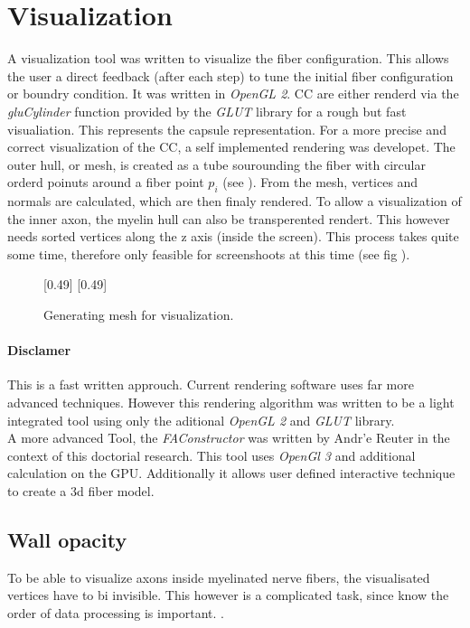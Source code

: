 \section{Visualization}
% 
A visualization tool was written to visualize the fiber configuration. This allows the user a direct feedback (\eg after each step) to tune the initial fiber configuration or boundry condition. It was written in \textit{OpenGL 2}.
% 
\ac{CC} are either renderd via the \textit{gluCylinder} function provided by the \textit{GLUT} library for a rough but fast visualiation. This represents the capsule representation. For a more precise and correct visualization of the \ac{CC}, a self implemented rendering was developet. The outer hull, or mesh, is created as a tube sourounding the fiber with circular orderd poinuts around a fiber point $p_i$ (see \dummy).
% 
From the mesh, vertices and normals are calculated, which are then finaly rendered. To allow a visualization of the inner axon, the myelin hull can also be transperented rendert. This however needs sorted vertices along the z axis (inside the screen). This process takes quite some time, therefore only feasible for screenshoots at this time (see fig \dummy).
% 
\begin{figure}[!t]
    \def\tikzwidth{0.5\textwidth}
    [0.49\textwidth]{
    }
    [0.49\textwidth]{
    }
	\caption{Generating mesh for visualization.}
	\label{fig:vis_mesh}
\end{figure}
% 
\paragraph{Disclamer}
This is a fast written approuch. Current rendering software uses far more advanced techniques. However this rendering algorithm was written to be a light integrated tool using only the aditional \textit{OpenGL 2} and \textit{GLUT} library.\\
% 
A more advanced Tool, the \textit{FAConstructor} \cite{Reuter2019} was written by Andr'e Reuter in the context of this doctorial research. This tool uses \textit{OpenGl 3} and additional calculation on the GPU. Additionally it allows user defined interactive technique to create a 3d fiber model.
% 
\subsection{Wall opacity}
% 
To be able to visualize axons inside myelinated nerve fibers, the visualisated vertices have to bi invisible.
This however is a complicated task, since know the order of data processing is important.
\dummy.
% 
% 
% 
